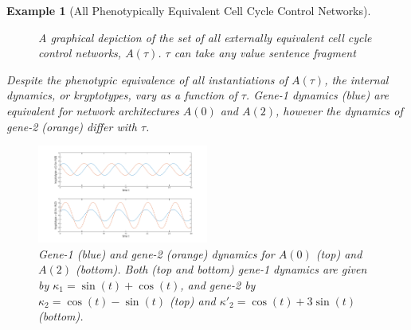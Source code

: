 \documentclass{article}
\newcommand{\plr}[1]{\todo[color=blue!25]{#1}}
\newcommand{\plri}[1]{{\color{blue}\it #1}}
\newcommand{\plr}[1]{{\color{blue}\it #1}}
\newcommand{\plri}[1]{\plr{#1}}
\newcommand{\1}{\mathbbm{1}}
\newtheorem{example}{Example}
\begin{document}
\begin{example}[All Phenotypically Equivalent Cell Cycle Control Networks]
\begin{figure}[H]
    \caption{A graphical depiction of the set of all externally equivalent cell cycle control networks, $A(\tau)$. 
        $\tau$ can take any value \plri{sentence fragment}}
    \end{figure}

   Despite the phenotypic equivalence of all instantiations of $A(\tau)$, the internal dynamics, or kryptotypes, vary as a function of $\tau$. 
    Gene-1 dynamics (blue) are equivalent for network architectures $A(0)$ and $A(2)$, however the dynamics of gene-2 (orange) differ with $\tau$.
  \begin{figure}[H]
    \centering
    \includegraphics[width=0.5\textwidth, height=0.25\paperheight]{osc_A0_A2_both_compare}
    \caption{Gene-1 (blue) and gene-2 (orange) dynamics for $A(0)$ (top) and $A(2)$ (bottom). Both (top and bottom) gene-1 dynamics are given by $ \kappa_{1} = \sin(t) + \cos(t)$, and gene-2 by $\kappa_{2} = \cos(t) - \sin(t)$ (top) and $\kappa'_{2} = \cos(t) + 3 \sin(t)$ (bottom).}
  \end{figure}
\end{example}
\end{document}
